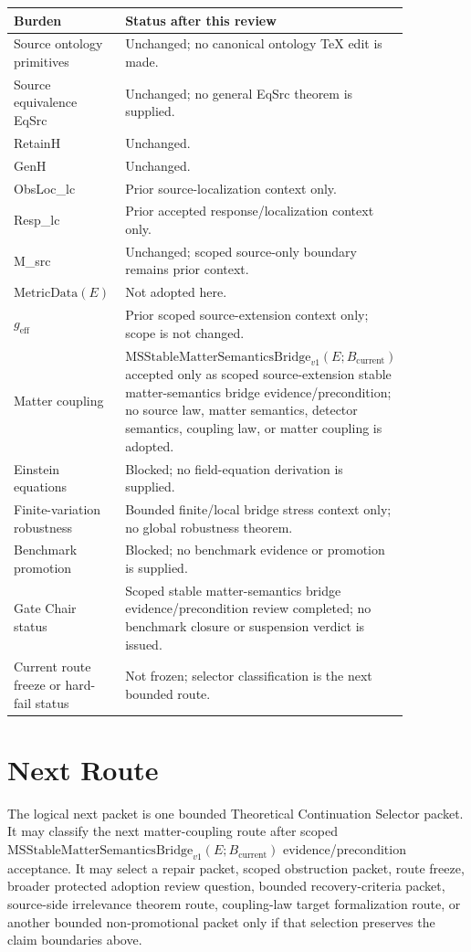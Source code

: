 \documentclass[11pt]{article}
\newcommand{\Bcur}{B_{\mathrm{current}}}
\newcommand{\MSBridge}{\mathrm{MSStableMatterSemanticsBridge}_{v1}}
\newcommand{\MetricData}{\mathrm{MetricData}}
\newcommand{\geff}{g_{\mathrm{eff}}}
\begin{document}
\begin{longtable}{p{0.30\linewidth}p{0.56\linewidth}}
\toprule
Burden & Status after this review \\
\midrule
Source ontology primitives & Unchanged; no canonical ontology TeX edit is made. \\
Source equivalence EqSrc & Unchanged; no general EqSrc theorem is supplied. \\
RetainH & Unchanged. \\
GenH & Unchanged. \\
ObsLoc\_lc & Prior source-localization context only. \\
Resp\_lc & Prior accepted response/localization context only. \\
M\_src & Unchanged; scoped source-only boundary remains prior context. \\
\(\MetricData(E)\) & Not adopted here. \\
\(\geff\) & Prior scoped source-extension context only; scope is not changed. \\
Matter coupling & \(\MSBridge(E;\Bcur)\) accepted only as scoped source-extension stable matter-semantics bridge evidence/precondition; no source law, matter semantics, detector semantics, coupling law, or matter coupling is adopted. \\
Einstein equations & Blocked; no field-equation derivation is supplied. \\
Finite-variation robustness & Bounded finite/local bridge stress context only; no global robustness theorem. \\
Benchmark promotion & Blocked; no benchmark evidence or promotion is supplied. \\
Gate Chair status & Scoped stable matter-semantics bridge evidence/precondition review completed; no benchmark closure or suspension verdict is issued. \\
Current route freeze or hard-fail status & Not frozen; selector classification is the next bounded route. \\
\bottomrule
\end{longtable}

\section{Next Route}

The logical next packet is one bounded Theoretical Continuation Selector
packet. It may classify the next matter-coupling route after scoped
\(\MSBridge(E;\Bcur)\) evidence/precondition acceptance. It may select a
repair packet, scoped obstruction packet, route freeze, broader protected
adoption review question, bounded recovery-criteria packet, source-side
irrelevance theorem route, coupling-law target formalization route, or
another bounded non-promotional packet only if that selection preserves the
claim boundaries above.
\end{document}
